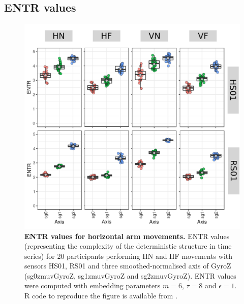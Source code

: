 \subsection{ENTR values}
\begin{figure}
\centering
\includegraphics[width=1.0\textwidth]{entr-bp}
    \caption{
	{\bf ENTR values for horizontal arm movements.}
    	ENTR values (representing the complexity of the deterministic 
	structure in time series) for 
	20 participants performing HN and HF movements
	with sensors HS01, RS01 and three smoothed-normalised axis 
	of GyroZ (sg0zmuvGyroZ, sg1zmuvGyroZ and sg2zmuvGyroZ).
	ENTR values were computed with 
	embedding parameters $m=6$, $\tau=8$ and $\epsilon=1$.
	R code to reproduce the figure is available from \cite{hwum2018}.
        }
    \label{fig:entr_aH}
\end{figure}
%




%
%
%
%
%


